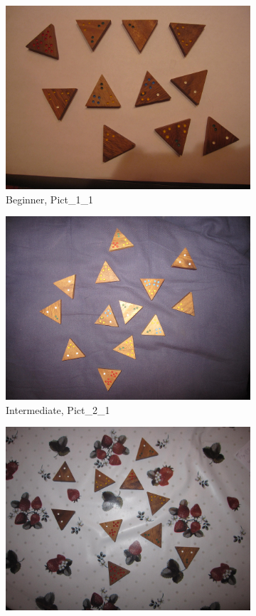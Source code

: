 \documentclass[12pt]{article}
\begin{document}
\begin{figure}[!h]
    \begin{subfigure}{.32\linewidth}
    \includegraphics[width=0.93\linewidth]{Pict_1_1.png}
    \centering
    \caption{Beginner, Pict\_1\_1}
    \label{fig:input_beginner}
    \end{subfigure}
    \begin{subfigure}{.32\linewidth}
    \includegraphics[width=0.93\linewidth]{Pict_2_1.png}
    \centering
    \caption{Intermediate, Pict\_2\_1}
    \label{fig:input_intermediate}
    \end{subfigure}
    \begin{subfigure}{.32\linewidth}
    \includegraphics[width=0.93\linewidth]{Pict_4_1.png}

\end{subfigure}
\end{figure}
\end{document}
